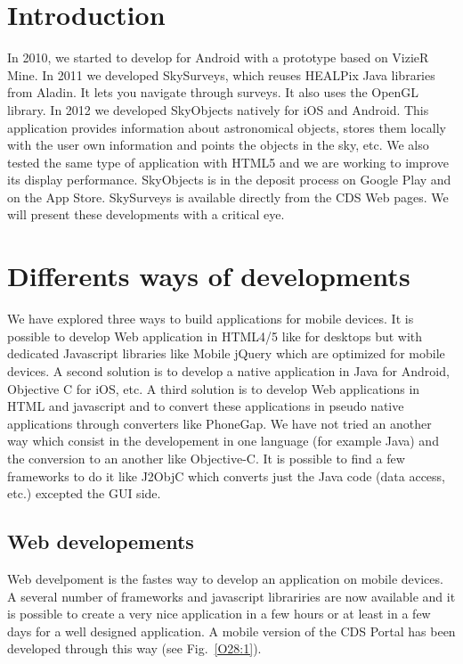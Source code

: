 \documentclass[11pt,twoside]{article}
\begin{document}
\section{Introduction}
In 2010, we started to develop for Android with a prototype based on VizieR Mine. In 2011 we developed SkySurveys, which reuses HEALPix Java libraries from Aladin. It lets you navigate through surveys. It also uses the OpenGL library. In 2012 we developed SkyObjects natively for iOS and Android. This application provides information about astronomical objects, stores them locally with the user own information and points the objects in the sky, etc. We also tested the same type of application with HTML5 and we are working to improve its display performance. SkyObjects is in the deposit process on Google Play and on the App Store. SkySurveys is available directly from the CDS Web pages. We will present these developments with a critical eye.

\section{Differents ways of developments}

We have explored three ways to build applications for mobile devices.
It is possible to develop Web application in HTML4/5 like for desktops but with dedicated Javascript libraries like Mobile jQuery which are optimized for mobile devices.
A second solution is to develop a native application in Java for Android, Objective C for iOS, etc. 
A third solution is to develop Web applications in HTML and javascript and to convert these applications in pseudo native applications through converters like PhoneGap.
We have not tried an another way which consist in the developement in one language (for example Java) and the conversion to an another like Objective-C. It is possible to find a few frameworks to do it like J2ObjC which converts just the Java code (data access, etc.) excepted the GUI side.

\subsection{Web developements}
Web develpoment is the fastes way to develop an application on mobile devices. A several number of frameworks and javascript librariries are now available and it is possible to create a very nice application in a few hours or at least in a few days for a well designed application.
A mobile version of the CDS Portal has been developed through this way (see Fig.~\ref{O28:1}).
\end{document}
